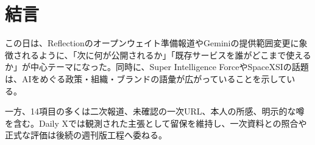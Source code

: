 \section*{結言}
この日は、Reflectionのオープンウェイト準備報道やGeminiの提供範囲変更に象徴されるように、「次に何が公開されるか」「既存サービスを誰がどこまで使えるか」が中心テーマになった。同時に、Super Intelligence ForceやSpaceXSIの話題は、AIをめぐる政策・組織・ブランドの語彙が広がっていることを示している。

一方、14項目の多くは二次報道、未確認の一次URL、本人の所感、明示的な噂を含む。Daily Xでは観測された主張として留保を維持し、一次資料との照合や正式な評価は後続の週刊版工程へ委ねる。
